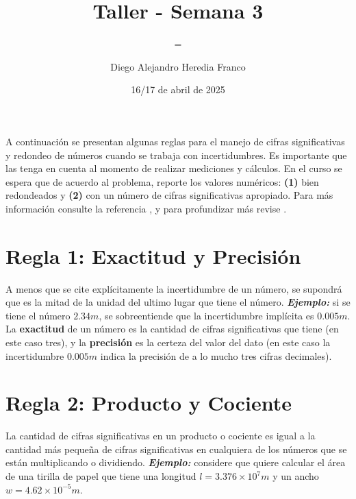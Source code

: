 \documentclass{replab}
\title{Taller - Semana 3}
\author{Diego Alejandro Heredia Franco}
\date{16/17 de abril de 2025}
\subtitle={Valoración y Redondeo}
\begin{document}
\setlength{\parindent}{0pt}
	
	\pagestyle{fancy}
	\unspacedoperators
	
	{\begin{tcolorbox}[colframe=white, colback=principaldos, arc=8pt]
		\begin{center}
			\maketitle

		\end{center}
	\end{tcolorbox}}

	A continuación se presentan algunas reglas para el manejo de cifras significativas y redondeo de números cuando se trabaja con incertidumbres. Es importante que las tenga en cuenta al momento de realizar mediciones y cálculos. En el curso se espera que de acuerdo al problema, reporte los valores numéricos: \textbf{(1)} bien redondeados y \textbf{(2)}  con un número de cifras significativas apropiado. Para más información consulte la referencia \cite{lanaturaleza}, y para profundizar más revise \cite{ardila}. 

	\section{Regla 1: Exactitud y Precisión}

	A menos que se cite explícitamente la incertidumbre de un número, se supondrá que es la mitad de la unidad del ultimo lugar que tiene el número. \textit{\textbf{Ejemplo:}} si se tiene el número $2.34m$, se sobreentiende que la incertidumbre implícita es $0.005m$. La \textbf{exactitud} de un número es la cantidad de cifras significativas que tiene (en este caso tres), y la \textbf{precisión} es la certeza del valor del dato (en este caso la incertidumbre $0.005m$ indica la precisión de a lo mucho tres cifras decimales). 

	\section{Regla 2: Producto y Cociente}

	La cantidad de cifras significativas en un producto o cociente es igual a la cantidad más pequeña de cifras significativas en cualquiera de los números que se están multiplicando o dividiendo. \textit{\textbf{Ejemplo:}} considere que quiere calcular el área de una tirilla de papel que tiene una longitud $l=3.376\times 10^7m $ y un ancho $w=4.62\times 10^{-5}m$. 
\end{document}

